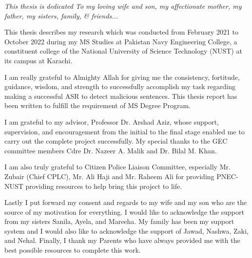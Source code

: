 \certificateoforiginality


\begin{dedication}
\textit{This thesis is dedicated To my loving wife and son, my affectionate mother, my father, my sisters, family, \& friends...}
\end{dedication}

\begin{acknowledgments}
This thesis describes my research which was conducted from February 2021 to October 2022 during my MS Studies at Pakistan Navy Engineering College, a constituent college of the National University of Science Technology (NUST) at its campus at Karachi.
    \par
I am really grateful to Almighty Allah for giving me the consistency, fortitude, guidance, wisdom, and strength to successfully accomplish my task regarding making a successful ASR to detect malicious sentences. This thesis report has been written to fulfill the requirement of MS Degree Program.
    \par 
I am grateful to my advisor, Professor Dr. Arshad Aziz, whose support, supervision, and encouragement from the initial to the final stage enabled me to carry out the complete project successfully. My special thanks to the GEC committee members Cdre Dr. Nazeer A. Malik and Dr. Bilal M. Khan.
    \par
I am also truly grateful to Citizen Police Liaison Committee, especially Mr. Zubair (Chief CPLC), Mr. Ali Haji and Mr. Raheem Ali for providing PNEC-NUST providing resources to help bring this project to life. 
    \par
Lastly I put forward my consent and regards to my wife and my son who are the source of my motivation for everything. I would like to acknowledge the support from my sisters Sanila, Ayela, and Mareeha. My family has been my support system and I would also like to acknowledge the support of Jawad, Nashwa, Zaki, and Nehal. Finally, I thank my Parents who have always provided me with the best possible resources to complete this work.

\end{acknowledgments}

\tableofcontents
\listoftables
\clearpage
\listoffigures
\clearpage




\newpage

%



\begin{abstract}
  
\end{abstract}


\clearpage{} %
